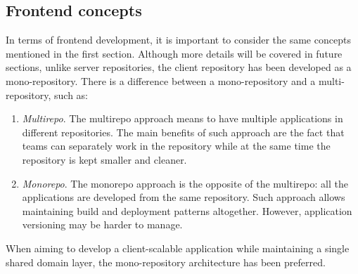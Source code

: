 \documentclass[../memory.tex]{subfiles}
\begin{document}
\subsection{Frontend concepts}
In terms of frontend development, it is important to consider the same concepts
mentioned in the first section. Although more details will be covered in future
sections, unlike server repositories, the client repository has been developed
as a mono-repository. There is a difference between a mono-repository and a
multi-repository, such as:
\begin{enumerate}[label = -]
	\item\emph{Multirepo}. The multirepo approach means to have multiple
	applications in different repositories. The main benefits of such approach
	are the fact that teams can separately work in the repository while at the
	same time the repository is kept smaller and cleaner.
	\item\emph{Monorepo}. The monorepo approach is the opposite of the multirepo:
	all the applications are developed from the same repository. Such approach
	allows maintaining build and deployment patterns altogether. However,
	application versioning may be harder to manage.
\end{enumerate}
When aiming to develop a client-scalable application while maintaining a single
shared domain layer, the mono-repository architecture has been preferred.
\end{document}
